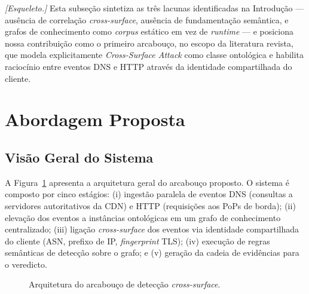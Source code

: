 \documentclass[preprint,12pt]{elsarticle}
\begin{document}
\textit{[Esqueleto.]} Esta subseção sintetiza as três lacunas identificadas na Introdução --- ausência de correlação \emph{cross-surface}, ausência de fundamentação semântica, e grafos de conhecimento como \emph{corpus} estático em vez de \emph{runtime} --- e posiciona nossa contribuição como o primeiro arcabouço, no escopo da literatura revista, que modela explicitamente \emph{Cross-Surface Attack} como classe ontológica e habilita raciocínio entre eventos DNS e HTTP através da identidade compartilhada do cliente.


\section{Abordagem Proposta}
\label{sec:approach}

\subsection{Visão Geral do Sistema}

A Figura~\ref{fig:architecture} apresenta a arquitetura geral do arcabouço proposto. O sistema é composto por cinco estágios: (i) ingestão paralela de eventos DNS (consultas a servidores autoritativos da CDN) e HTTP (requisições aos PoPs de borda); (ii) elevação dos eventos a instâncias ontológicas em um grafo de conhecimento centralizado; (iii) ligação \emph{cross-surface} dos eventos via identidade compartilhada do cliente (ASN, prefixo de IP, \emph{fingerprint} TLS); (iv) execução de regras semânticas de detecção sobre o grafo; e (v) geração da cadeia de evidências para o veredicto.

\begin{figure}[htbp]
\centering
{}
\caption{Arquitetura do arcabouço de detecção \emph{cross-surface}.}
\label{fig:architecture}
\end{figure}
\end{document}
